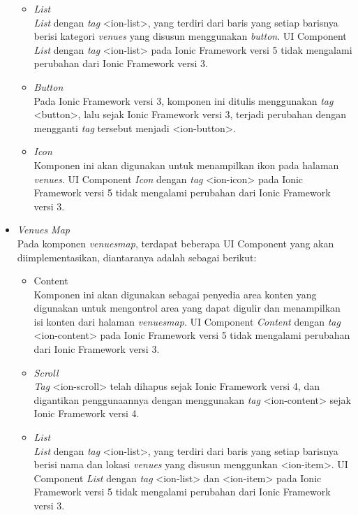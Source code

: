 \begin{itemize}
\begin{itemize}
\newpage

			\item \textit{List} \\
		\textit{List} dengan \textit{tag} <ion-list>, yang terdiri dari baris yang setiap barisnya berisi kategori \textit{venues} yang disusun menggunakan \textit{button}. UI Component \textit{List} dengan \textit{tag} <ion-list> pada Ionic Framework versi 5 tidak mengalami perubahan dari Ionic Framework versi 3.
		
			\item \textit{Button} \\
		Pada Ionic Framework versi 3, komponen ini ditulis menggunakan \textit{tag} <button>, lalu sejak Ionic Framework versi 3, terjadi perubahan dengan mengganti \textit{tag} tersebut menjadi <ion-button>.
		
			\item \textit{Icon} \\
		Komponen ini akan digunakan untuk menampilkan ikon pada halaman \textit{venues}. UI Component \textit{Icon} dengan \textit{tag} <ion-icon> pada Ionic Framework versi 5 tidak mengalami perubahan dari Ionic Framework versi 3.
		\end{itemize}	
		
	\item \textit{Venues Map}\\
	Pada komponen \textit{venues\textunderscore map}, terdapat beberapa UI Component yang akan diimplementasikan, diantaranya adalah sebagai berikut:
	\begin{itemize}
			\item Content \\
		Komponen ini akan digunakan sebagai penyedia area konten yang digunakan untuk mengontrol area yang dapat digulir dan menampilkan isi konten dari halaman \textit{venues\textunderscore map}. UI Component \textit{Content} dengan \textit{tag} <ion-content> pada Ionic Framework versi 5 tidak mengalami perubahan dari Ionic Framework versi 3.

			\item \textit{Scroll} \\
			\textit{Tag} <ion-scroll> telah dihapus sejak Ionic Framework versi 4, dan digantikan penggunaannya dengan menggunakan \textit{tag} <ion-content> sejak Ionic Framework versi 4.		
		
			\item \textit{List} \\
		\textit{List} dengan \textit{tag} <ion-list>, yang terdiri dari baris yang setiap barisnya berisi nama dan lokasi \textit{venues} yang disusun menggunkan <ion-item>. UI Component \textit{List} dengan \textit{tag} <ion-list> dan <ion-item> pada Ionic Framework versi 5 tidak mengalami perubahan dari Ionic Framework versi 3.
		\end{itemize}



\end{itemize}
